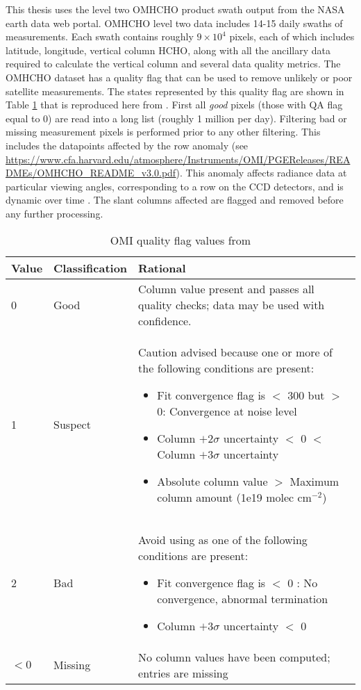     This thesis uses the level two OMHCHO product swath output from the NASA earth data web portal.
    OMHCHO level two data includes 14-15 daily swaths of measurements.
    Each swath contains roughly $9 \times 10^4$ pixels, each of which includes latitude, longitude, vertical column HCHO, along with all the ancillary data required to calculate the vertical column and several data quality metrics.
    The OMHCHO dataset has a quality flag that can be used to remove unlikely or poor satellite measurements.
    The states represented by this quality flag are shown in Table \ref{Model:datasets:OMHCHO:tab_qflag} that is reproduced here from \textcite{Kurosu2014}.
    First all \textit{good} pixels (those with QA flag equal to 0) are read into a long list (roughly 1 million per day).
    Filtering bad or missing measurement pixels is performed prior to any other filtering.
    This includes the datapoints affected by the row anomaly (see \url{https://www.cfa.harvard.edu/atmosphere/Instruments/OMI/PGEReleases/READMEs/OMHCHO_README_v3.0.pdf}).
    This anomaly affects radiance data at particular viewing angles, corresponding to a row on the CCD detectors, and is dynamic over time \parencite{Huang2018}.
    The slant columns affected are flagged and removed before any further processing.
    
    \begin{table}
      \caption{OMI quality flag values from \textcite{Kurosu2014}}
      \begin{tabular}{  l  l  p{10cm} }
        \hline
        \textbf{Value} & \textbf{Classification} & \textbf{Rational} 
        \\ \hline
        0 & Good & Column value present and passes all quality checks; data may be used with confidence. 
        \\ \hline
        1 & Suspect & Caution advised because one or more of the following conditions are present: 
        \begin{itemize}
          \item Fit convergence flag is $<$ 300 but $>$ 0: Convergence at noise level
          \item Column $+ 2 \sigma$ uncertainty $<$ 0 $<$ Column $ + 3 \sigma $ uncertainty
          \item Absolute column value $>$ Maximum column amount (1e19 molec cm$^{-2}$)
        \end{itemize}
        \\ \hline
        2 & Bad & Avoid using as one of the following conditions are present: 
        \begin{itemize}
          \item Fit convergence flag is $<$ 0 : No convergence, abnormal termination
          \item Column $+ 3 \sigma$ uncertainty $<$ 0
        \end{itemize}
        \\ \hline
        $<0$ & Missing & No column values have been computed; entries are missing
        \\ \hline
      \end{tabular}
      \label{Model:datasets:OMHCHO:tab_qflag}
    \end{table}
    
